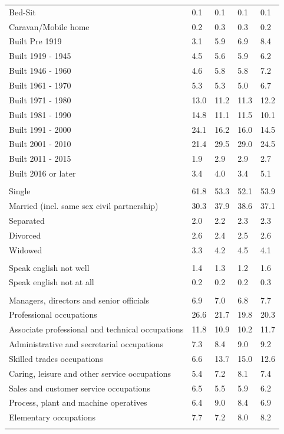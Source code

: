 \documentclass{article}
\begin{document}
\begin{table}[h]
\begin{tabular}{KTTTT}
Bed-Sit & 0.1& 0.1& 0.1& 0.1\\
Caravan/Mobile home & 0.2& 0.3& 0.3& 0.2\\
    \hline
Built Pre 1919 & 3.1& 5.9& 6.9& 8.4\\
Built 1919 - 1945 & 4.5& 5.6& 5.9& 6.2\\
Built  1946 - 1960 & 4.6& 5.8& 5.8& 7.2\\
Built  1961 - 1970 & 5.3& 5.3& 5.0& 6.7\\
Built  1971 - 1980 & 13.0& 11.2& 11.3& 12.2\\
Built  1981 - 1990 & 14.8& 11.1& 11.5& 10.1\\
Built  1991 - 2000 & 24.1& 16.2& 16.0& 14.5\\
Built  2001 - 2010 & 21.4& 29.5& 29.0& 24.5\\
Built  2011 - 2015 & 1.9& 2.9& 2.9& 2.7\\
Built  2016 or later & 3.4& 4.0& 3.4& 5.1\\
\hline
    \\
    \hline
Single & 61.8& 53.3& 52.1& 53.9\\
Married (incl. same sex civil partnership) & 30.3& 37.9& 38.6& 37.1\\
Separated  & 2.0& 2.2& 2.3& 2.3\\
Divorced  & 2.6& 2.4& 2.5& 2.6\\
Widowed & 3.3& 4.2& 4.5& 4.1\\
\hline
    \\ 
    \hline
Speak english not well & 1.4& 1.3& 1.2& 1.6\\
Speak english not at all & 0.2& 0.2& 0.2& 0.3\\
\hline
    \\
    \hline
Managers, directors and senior officials & 6.9& 7.0& 6.8& 7.7\\
Professional occupations & 26.6& 21.7& 19.8& 20.3\\
Associate professional and technical occupations & 11.8& 10.9& 10.2& 11.7\\
Administrative and secretarial occupations & 7.3& 8.4& 9.0& 9.2\\
Skilled trades occupations &  6.6& 13.7& 15.0& 12.6\\
Caring, leisure and other service occupations & 5.4& 7.2& 8.1& 7.4\\
Sales and customer service occupations & 6.5& 5.5& 5.9& 6.2\\
Process, plant and machine operatives & 6.4& 9.0& 8.4& 6.9\\
Elementary occupations & 7.7& 7.2& 8.0& 8.2\\
\hline
\end{tabular}
\end{table}
\end{document}
